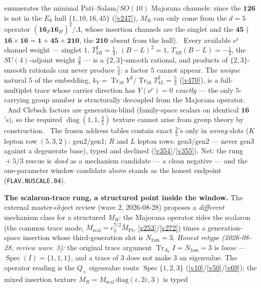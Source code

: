 \documentclass[11pt,a4paper]{article}
\newcommand{\Mbar}{\bar M_{\mathrm{Pl}}}
\newcommand{\Nfam}{N_{\mathrm{fam}}}
\theoremstyle{definition}
\begin{document}
enumerates the minimal Pati--Salam/$SO(10)$ Majorana channels: since the $\overline{\mathbf{126}}$ is not in the
$E_8$ hull $\{1,10,16,45\}$ (\vref{v247}), $M_R$ can only come from the $d{=}5$ operator
$(\mathbf{16}_F\overline{\mathbf{16}}_H)^2/\Lambda$, whose insertion channels are the singlet and the
$\mathbf{45}$ ($\mathbf{16}\times\overline{\mathbf{16}}=\mathbf{1}+\mathbf{45}+\mathbf{210}$, the $\mathbf{210}$
absent from the hull). \mE\ Every available $\nu^c$ channel weight --- singlet $1$, $T_{3R}^2=\tfrac14$,
$(B{-}L)^2=1$, $T_{3R}(B{-}L)=-\tfrac12$, the $SU(4)$-adjoint weight $\tfrac38$ --- is a $\{2,3\}$-smooth
rational, and products of $\{2,3\}$-smooth rationals can never produce $\tfrac53$: a factor $5$ cannot appear.
The \emph{unique} natural $5$ of the embedding, $k_Y=\operatorname{Tr}_{16}Y^2/\operatorname{Tr}_{16}T_{3L}^2
=\tfrac53$ (\vref{v470}), is a full-multiplet trace whose carrier direction has $Y(\nu^c)=0$ \emph{exactly} ---
the only $5$-carrying group number is structurally decoupled from the Majorana operator. \mE\ And Clebsch factors
are generation-blind (family-space scalars on identical $\mathbf{16}$'s), so the required
$\operatorname{diag}(1,1,\tfrac35)$ texture cannot arise from group theory by construction. \mO\ The frozen
address tables contain exact $\tfrac35$'s only in \emph{wrong} slots ($K$ lepton row $(5,3,2)$: gen2/gen1; $R$
and $L$ lepton rows: gen3/gen2 --- never gen3 against a degenerate base), typed and declined
(\vref{v354}/\vref{v355}). Net: the rung${}+{}5/3$ rescue is \emph{dead} as a mechanism candidate --- a clean
negative --- and the one-parameter window candidate above stands as the honest endpoint
(\texttt{FLAV.NUSCALE.04}).
\par\smallskip\noindent\textbf{The scalaron-trace rung, a structured point inside the window.}
The external master-object review (wave 2, 2026-08-28)
proposes a \emph{different} mechanism class for a structured $M_R$: the Majorana operator rides
the scalaron (the common trace mode, $M_{\mathrm{scal}}=c_3^{7/2}\Mbar$, \vref{v253}/\vref{v272})
times a generation-space insertion whose third-generation slot is $\Nfam=3$.
\emph{Honest retype (2026-08-28, review wave~3):} the original trace argument
$\operatorname{Tr}_{A_3}I=\Nfam=3$ is \emph{loose} --- $\operatorname{Spec}(I)=\{1,1,1\}$, and a
trace of $3$ does not make $3$ an eigenvalue.  The operator reading is the $Q_+$ eigenvalue
route $\operatorname{Spec}\{1,2,3\}$ (\vref{v10}/\vref{v50}/\vref{v69}); the mixed insertion
texture $M_R=M_{\mathrm{scal}}\,\mathrm{diag}(\varepsilon,2\varepsilon,3)$ is typed
\end{document}
